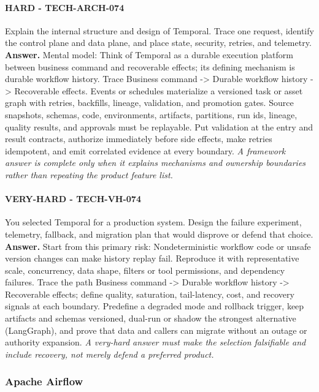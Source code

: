 \paragraph{HARD - TECH-ARCH-074} Explain the internal structure and design of Temporal. Trace one request, identify the control plane and data plane, and place state, security, retries, and telemetry.
\textbf{Answer.} Mental model: Think of Temporal as a durable execution platform between business command and recoverable effects; its defining mechanism is durable workflow history. Trace Business command -> Durable workflow history -> Recoverable effects. Events or schedules materialize a versioned task or asset graph with retries, backfills, lineage, validation, and promotion gates. Source snapshots, schemas, code, environments, artifacts, partitions, run ids, lineage, quality results, and approvals must be replayable. Put validation at the entry and result contracts, authorize immediately before side effects, make retries idempotent, and emit correlated evidence at every boundary.
\textit{A framework answer is complete only when it explains mechanisms and ownership boundaries rather than repeating the product feature list.}
\paragraph{VERY-HARD - TECH-VH-074} You selected Temporal for a production system. Design the failure experiment, telemetry, fallback, and migration plan that would disprove or defend that choice.
\textbf{Answer.} Start from this primary risk: Nondeterministic workflow code or unsafe version changes can make history replay fail. Reproduce it with representative scale, concurrency, data shape, filters or tool permissions, and dependency failures. Trace the path Business command -> Durable workflow history -> Recoverable effects; define quality, saturation, tail-latency, cost, and recovery signals at each boundary. Predefine a degraded mode and rollback trigger, keep artifacts and schemas versioned, dual-run or shadow the strongest alternative (LangGraph), and prove that data and callers can migrate without an outage or authority expansion.
\textit{A very-hard answer must make the selection falsifiable and include recovery, not merely defend a preferred product.}
\subsubsection*{Apache Airflow}
